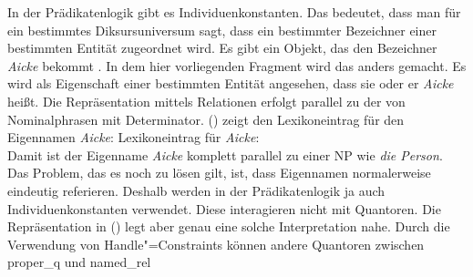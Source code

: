 In der Prädikatenlogik gibt es Individuenkonstanten. Das bedeutet, dass man für ein bestimmtes
Diksursuniversum sagt, dass ein bestimmter Bezeichner einer bestimmten Entität zugeordnet wird. Es
gibt ein Objekt, das den Bezeichner \emph{Aicke} bekommt \citep[68]{AAD73a}. In dem hier
vorliegenden Fragment wird das anders gemacht. Es wird als Eigenschaft einer bestimmten Entität
angesehen, dass sie oder er \emph{Aicke} heißt. Die Repräsentation mittels Relationen erfolgt
parallel zu der von Nominalphrasen mit Determinator. () zeigt den Lexikoneintrag für den
Eigennamen \emph{Aicke}:
\eas
Lexikoneintrag für \emph{Aicke}:\\
\zs
Damit ist der Eigenname \emph{Aicke} komplett parallel zu einer NP wie \emph{die Person}. Das
Problem, das es noch zu lösen gilt, ist, dass Eigennamen normalerweise eindeutig referieren. Deshalb
werden in der Prädikatenlogik ja auch Individuenkonstanten verwendet. Diese interagieren nicht mit
Quantoren. Die Repräsentation in () legt aber genau eine solche Interpretation nahe. Durch
die Verwendung von Handle"=Constraints können andere Quantoren zwischen proper\_q und named\_rel
